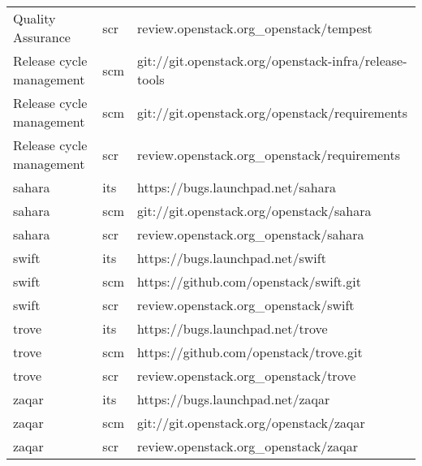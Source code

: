 \begin{center}
\begin{longtable}{|p{4cm}|p{1cm}|p{10cm}|}
Quality Assurance&scr&review.openstack.org\_openstack/tempest\\ 
Release cycle management&scm&git://git.openstack.org/openstack-infra/release-tools\\ 
Release cycle management&scm&git://git.openstack.org/openstack/requirements\\ 
Release cycle management&scr&review.openstack.org\_openstack/requirements\\ 
sahara&its&https://bugs.launchpad.net/sahara\\ 
sahara&scm&git://git.openstack.org/openstack/sahara\\ 
sahara&scr&review.openstack.org\_openstack/sahara\\ 
swift&its&https://bugs.launchpad.net/swift\\ 
swift&scm&https://github.com/openstack/swift.git\\ 
swift&scr&review.openstack.org\_openstack/swift\\ 
trove&its&https://bugs.launchpad.net/trove\\ 
trove&scm&https://github.com/openstack/trove.git\\ 
trove&scr&review.openstack.org\_openstack/trove\\ 
zaqar&its&https://bugs.launchpad.net/zaqar\\ 
zaqar&scm&git://git.openstack.org/openstack/zaqar \\ 
zaqar&scr&review.openstack.org\_openstack/zaqar \\

\hline
\end{longtable}
\end{center}

